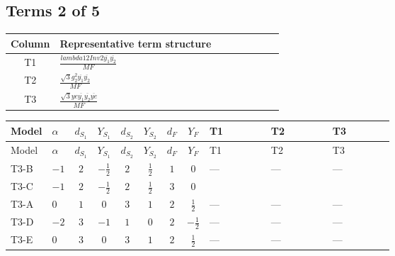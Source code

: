 \documentclass[8pt]{article}
\begin{document}
\begin{landscape}
\subsection*{Terms 2 of 5}
\begin{center}
\begin{tabular}{@{}c >{\raggedright\arraybackslash}p{0.82\linewidth}@{}}
\toprule
Column & Representative term structure \\
\midrule
T1 & \(\displaystyle \frac{lambda12Inv2 \overline{y_{1}} \overline{y_{2}}}{MF}\) \\
\midrule
T2 & \(\displaystyle \frac{\sqrt{3} g_{2}^{2} \overline{y_{1}} \overline{y_{2}}}{MF}\) \\
\midrule
T3 & \(\displaystyle \frac{\sqrt{3} ye \overline{y_{1}} \overline{y_{2}} \overline{ye}}{MF}\) \\
\midrule
\bottomrule
\end{tabular}
\end{center}
\smallskip
\tiny
\begin{longtable}{@{}llcccccc >{\raggedright\arraybackslash}p{0.21\linewidth} >{\raggedright\arraybackslash}p{0.21\linewidth} >{\raggedright\arraybackslash}p{0.21\linewidth}@{}}
\toprule
Model & $\alpha$ & $d_{S_1}$ & $Y_{S_1}$ & $d_{S_2}$ & $Y_{S_2}$ & $d_F$ & $Y_F$ & T1 & T2 & T3 \\
\midrule
\endfirsthead
\toprule
Model & $\alpha$ & $d_{S_1}$ & $Y_{S_1}$ & $d_{S_2}$ & $Y_{S_2}$ & $d_F$ & $Y_F$ & T1 & T2 & T3 \\
\midrule
\endhead
T3-B & $-1$ & $2$ & $-\frac{1}{2}$ & $2$ & $\frac{1}{2}$ & $1$ & $0$ & --- & --- & --- \\
\midrule
T3-C & $-1$ & $2$ & $-\frac{1}{2}$ & $2$ & $\frac{1}{2}$ & $3$ & $0$ & \scriptsize\adjustbox{max width=\linewidth}{$\begin{gathered} \frac{2 lambda12Inv2 \overline{y_{1}} \overline{y_{2}}}{3 MF}\end{gathered}$} & \scriptsize\adjustbox{max width=\linewidth}{$\begin{gathered} \frac{\sqrt{3} g_{2}^{2} \overline{y_{1}} \overline{y_{2}}}{2 MF}\end{gathered}$} & \scriptsize\adjustbox{max width=\linewidth}{$\begin{gathered} - \frac{\sqrt{3} ye \overline{y_{1}} \overline{y_{2}} \overline{ye}}{6 MF}\end{gathered}$} \\
\midrule
T3-A & $0$ & $1$ & $0$ & $3$ & $1$ & $2$ & $\frac{1}{2}$ & --- & --- & --- \\
\midrule
T3-D & $-2$ & $3$ & $-1$ & $1$ & $0$ & $2$ & $-\frac{1}{2}$ & --- & --- & --- \\
\midrule
T3-E & $0$ & $3$ & $0$ & $3$ & $1$ & $2$ & $\frac{1}{2}$ & --- & --- & --- \\
\midrule
\bottomrule
\end{longtable}
\clearpage

\end{landscape}
\end{document}
